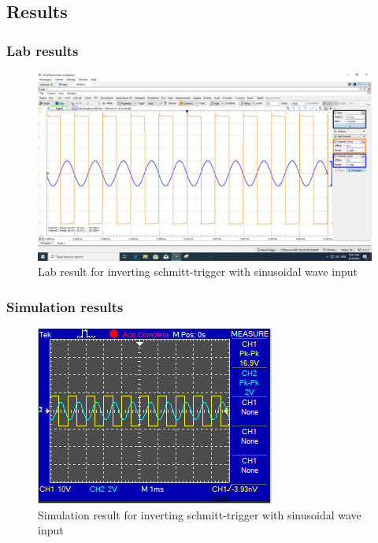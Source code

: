 \documentclass[a4paper, 12pt, english]{article}
\newlength{\simheight}
\begin{document}
\subsection{Results}

\subsubsection{Lab results}
\begin{figure}[H]
    \centering
    \includegraphics[width=\linewidth]{images/Inverting-Schmitt-Trigger-Lab.png}
    \caption{Lab result for inverting schmitt-trigger with sinusoidal wave input}
    \label{fig:Lab result for inverting schmitt-trigger with sinusoidal wave input}
\end{figure}


\subsubsection{Simulation results}
\begin{figure}[H]
    \centering
    \includegraphics[width=\linewidth, height=\simheight]{images/Inverting-Schmitt-Trigger-Sim.png}
    \caption{Simulation result for inverting schmitt-trigger with sinusoidal wave input}
    \label{fig:Simulation result for inverting schmitt-trigger with sinusoidal wave input}
\end{figure}
\end{document}
